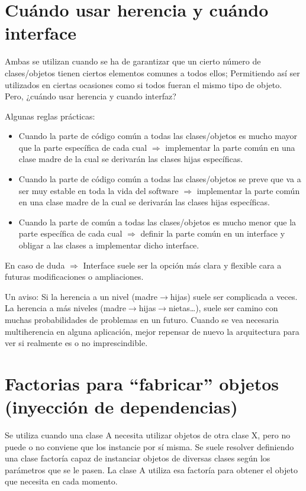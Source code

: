 \documentclass[spanish,12pt,a4paper,final,oneside]{book}
\begin{document}
\section{Cuándo usar herencia y cuándo interface}
Ambas se utilizan cuando se ha de garantizar que un cierto número de clases/objetos tienen ciertos elementos comunes a todos ellos; Permitiendo así ser utilizados en ciertas ocasiones como si todos fueran el mismo tipo de objeto. Pero, ¿cuándo usar herencia y cuando interfaz?

Algunas reglas prácticas:
\begin{itemize}
\item Cuando la parte de código común a todas las clases/objetos es mucho mayor que la parte específica de cada cual $\Rightarrow$ implementar la parte común en una clase madre de la cual se derivarán las clases hijas específicas.
\item Cuando la parte de código común a todas las clases/objetos se preve que va a ser muy estable en toda la vida del software $\Rightarrow$ implementar la parte común en una clase madre de la cual se derivarán las clases hijas específicas.
\item Cuando la parte de común a todas las clases/objetos es mucho menor que la parte específica de cada cual $\Rightarrow$ definir la parte común en un interface y obligar a las clases a implementar dicho interface.
\end{itemize}
En caso de duda $\Rightarrow$ Interface suele ser la opción más clara y flexible cara a futuras modificaciones o ampliaciones.

Un aviso: Si la herencia a un nivel (madre$\rightarrow$hijas) suele ser complicada a veces. La herencia a más niveles (madre$\rightarrow$hijas$ \rightarrow$nietas\ldots), suele ser camino con muchas probabilidades de problemas en un futuro. Cuando se vea necesaria multiherencia en alguna aplicación, mejor repensar de nuevo la arquitectura para ver si realmente es o no imprescindible.

\section{Factorias para ``fabricar'' objetos (inyección de dependencias)}
Se utiliza cuando una clase A necesita utilizar objetos de otra clase X, pero no puede o no conviene que los instancie por sí misma. Se suele resolver definiendo una clase factoría capaz de instanciar objetos de diversas clases según los parámetros que se le pasen. La clase A utiliza esa factoría para obtener el objeto que necesita en cada momento.
\end{document}
